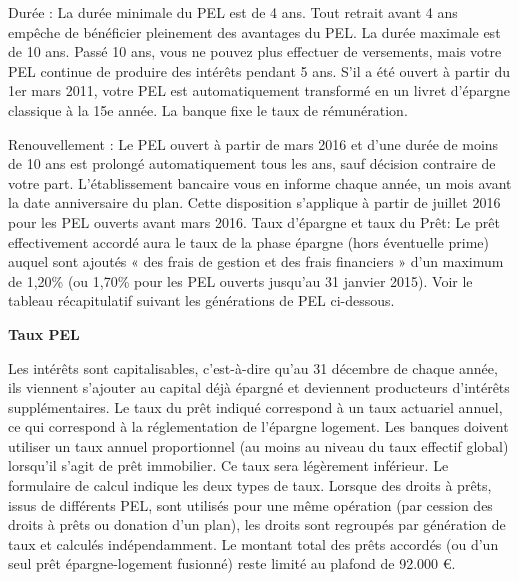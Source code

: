 \documentclass[12pt, a4paper]{book}
\begin{document}
{Durée : La durée minimale du PEL est de 4 ans. Tout retrait avant 4 ans empêche de bénéficier pleinement des avantages du PEL. La durée maximale est de 10 ans. Passé 10 ans, vous ne pouvez plus effectuer de versements, mais votre PEL continue de produire des intérêts pendant 5 ans. S'il a été ouvert à partir du 1er mars 2011, votre PEL est automatiquement transformé en un livret d'épargne classique à la 15e année. La banque fixe le taux de rémunération.

    Renouvellement : Le PEL ouvert à partir de mars 2016 et d'une durée de moins de 10 ans est prolongé automatiquement tous les ans, sauf décision contraire de votre part. L'établissement bancaire vous en informe chaque année, un mois avant la date anniversaire du plan. Cette disposition s'applique à partir de juillet 2016 pour les PEL ouverts avant mars 2016.
    Taux d'épargne et taux du Prêt: Le prêt effectivement accordé aura le taux de la phase épargne (hors éventuelle prime) auquel sont ajoutés « des frais de gestion et des frais financiers » d'un maximum de 1,20\% (ou 1,70\% pour les PEL ouverts jusqu'au 31 janvier 2015). Voir le tableau récapitulatif suivant les générations de PEL ci-dessous.


\begin{table}[h!]
	\caption{\bf Taux PEL}
	\bigskip	
	\label{taux_pel}
	\centering
\end{table}


Les intérêts sont capitalisables, c'est-à-dire qu'au 31 décembre de chaque année, ils viennent s'ajouter au capital déjà épargné et deviennent producteurs d'intérêts supplémentaires.
Le taux du prêt indiqué correspond à un taux actuariel annuel, ce qui correspond à la réglementation de l'épargne logement. Les banques doivent utiliser un taux annuel proportionnel (au moins au niveau du taux effectif global) lorsqu'il s'agit de prêt immobilier. Ce taux sera légèrement inférieur. Le formulaire de calcul indique les deux types de taux.
Lorsque des droits à prêts, issus de différents PEL, sont utilisés pour une même opération (par cession des droits à prêts ou donation d'un plan), les droits sont regroupés par génération de taux et calculés indépendamment. Le montant total des prêts accordés (ou d'un seul prêt épargne-logement fusionné) reste limité au plafond de 92.000 €.


}
\end{document}

